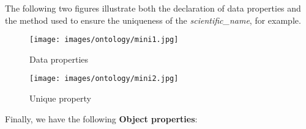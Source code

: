The following two figures illustrate both the declaration of data properties and the method used to ensure the uniqueness of the \textit{scientific\_name}, for example.
\bigskip

\begin{figure}[H]
    \centering
    \begin{minipage}{0.35\textwidth}
        \centering
        \texttt{[image: images/ontology/mini1.jpg]}
        \caption{Data properties}
        \label{fig:figura1}
    \end{minipage}%
    \hspace{0.1\textwidth}
    \begin{minipage}{0.35\textwidth}
        \centering
        \texttt{[image: images/ontology/mini2.jpg]}
        \caption{Unique property}
        \label{fig:figura2}
    \end{minipage}
\end{figure}

Finally, we have the following \textbf{Object properties}:
\bigskip

